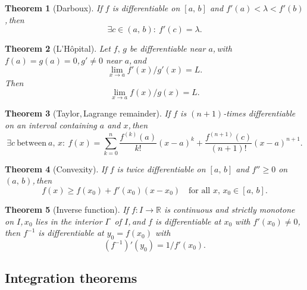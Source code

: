 \documentclass[11pt,reqno]{amsart}
\providecommand{\R}{\mathbb{R}}
\newcommand{\comma}{,\,\allowbreak}
\theoremstyle{redplain}
\newtheorem{theorem}{Theorem}
\begin{document}
\begin{theorem}[Darboux]
	\label{thm:darboux}
	If $f$ is differentiable on $[a\comma b]$ and $f'(a)<\lambda<f'(b)$\comma then
	\begin{equation}\label{eq:darboux}
	\exists c\in(a\comma b):\ f'(c)=\lambda.
	\end{equation}
\end{theorem}

\begin{theorem}[L'H\^opital]
	\label{thm:lhopital}
	Let $f\comma g$ be differentiable near $a$\comma with $f(a)=g(a)=0$\comma $g'\ne0$ near $a$\comma and $$\lim_{x\to a}f'(x)/g'(x)=L.$$ Then
	\begin{equation}\label{eq:lhopital}
	\lim_{x\to a}f(x)/g(x)=L.
	\end{equation}
\end{theorem}

\begin{theorem}[Taylor\comma Lagrange remainder]
	\label{thm:taylor}
	If $f$ is $(n+1)$-times differentiable on an interval containing $a$ and $x$\comma then
	\begin{equation}\label{eq:taylor}
	\exists c\ \text{between}\ a\comma x:\ f(x)=\sum_{k=0}^{n}\frac{f^{(k)}(a)}{k!}(x-a)^{k}+\frac{f^{(n+1)}(c)}{(n+1)!}(x-a)^{n+1}.
	\end{equation}
\end{theorem}

\begin{theorem}[Convexity]
	\label{thm:convexity}
	If $f$ is twice differentiable on $[a\comma b]$ and $f''\ge0$ on $(a\comma b)$\comma then
	\begin{equation}\label{eq:convexity}
	f(x)\ge f(x_0)+f'(x_0)(x-x_0)\quad\text{for all }x\comma x_0\in[a\comma b].
	\end{equation}
\end{theorem}

\begin{theorem}[Inverse function]
	\label{thm:inverse}
	If $f:I\to\R$ is continuous and strictly monotone on $I$\comma $x_0$ lies in the interior $I^\circ$ of $I$\comma and $f$ is differentiable at $x_0$ with $f'(x_0)\ne0$\comma then $f^{-1}$ is differentiable at $y_0=f(x_0)$ with
	\begin{equation}\label{eq:inverse}
	(f^{-1})'(y_0)=1/f'(x_0).
	\end{equation}
\end{theorem}

\subsection{Integration theorems}
\end{document}
